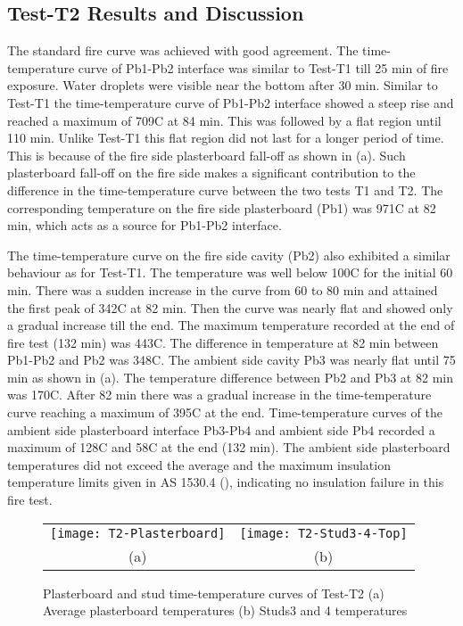 \subsection{Test-T2 Results and Discussion}\label{sec:t2-results}

The standard fire curve was achieved with good agreement. The time-temperature curve of Pb1-Pb2 interface was similar to Test-T1 till 25 min of fire exposure. Water droplets were visible near the bottom after 30 min. Similar to Test-T1 the time-temperature curve of Pb1-Pb2 interface showed a steep rise and reached a maximum of 709\degree C at 84 min. This was followed by a flat region until 110 min. Unlike Test-T1 this flat region did not last for a longer period of time. This is because of the fire side plasterboard fall-off as shown in  (a). Such plasterboard fall-off on the fire side makes a significant contribution to the difference in the time-temperature curve between the two tests T1 and T2. The corresponding temperature on the fire side plasterboard (Pb1) was 971\degree C at 82 min, which acts as a source for Pb1-Pb2 interface.

The time-temperature curve on the fire side cavity (Pb2) also exhibited a similar behaviour as for Test-T1. The temperature was well below 100\degree C for the initial 60 min. There was a sudden increase in the curve from 60 to 80 min and attained the first peak of 342\degree C at 82 min. Then the curve was nearly flat and showed only a gradual increase till the end. The maximum temperature recorded at the end of fire test (132 min) was 443\degree C. The difference in temperature at 82 min between Pb1-Pb2 and Pb2 was 348\degree C. The ambient side cavity Pb3 was nearly flat until 75 min as shown in  (a). The temperature difference between Pb2 and Pb3 at 82 min was 170\degree C. After 82 min there was a gradual increase in the time-temperature curve reaching a maximum of 395\degree C at the end. Time-temperature curves of the ambient side plasterboard interface Pb3-Pb4 and ambient side Pb4 recorded a maximum of 128\degree C and 58\degree C at the end (132 min). The ambient side plasterboard temperatures did not exceed the average and the maximum insulation temperature limits given in AS 1530.4 (\cite{StandardsAustral2014}), indicating no insulation failure in this fire test.

\begin{figure}[!htbp]
	\centering
		\begin{tabular}{cc}
			\texttt{[image: T2-Plasterboard]} & \texttt{[image: T2-Stud3-4-Top]} \\ 
			(a) & (b)  \\ 
		\end{tabular} 
		\caption{Plasterboard and stud time-temperature curves of Test-T2 (a) Average plasterboard temperatures (b) Studs3 and 4 temperatures}
		\label{fig:T2-PB-Stud}
\end{figure}

